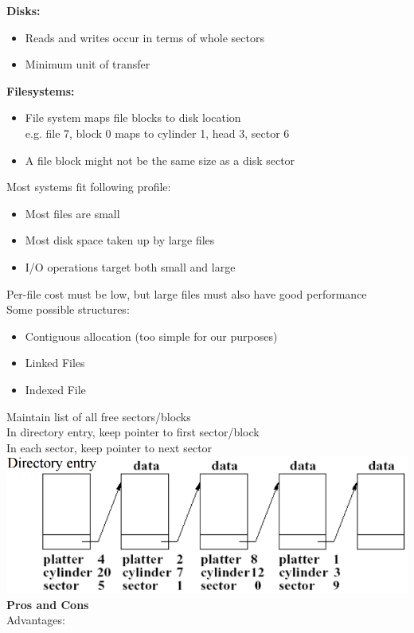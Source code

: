 \documentclass[number]{notes}
\begin{document}
\begin{landscape}
\begin{multicols}{3}
\textbf{Disks:}
\begin{itemize}[nolistsep]
    \item Reads and writes occur in terms of whole sectors
    \item Minimum unit of transfer
\end{itemize}
\textbf{Filesystems:}
\begin{itemize}[nolistsep]
    \item File system maps file blocks to disk location\\
    e.g. file 7, block 0 maps to cylinder 1, head 3, sector 6
    \item A file block might not be the same size as a disk sector
\end{itemize}
Most systems fit following profile:
\begin{itemize}[nolistsep]
    \item Most files are small
    \item Most disk space taken up by large files
    \item I/O operations target both small and large
\end{itemize}
Per-file cost must be low, but large files must also have good performance\\
Some possible structures:
\begin{itemize}[nolistsep]
    \item Contiguous allocation (too simple for our purposes)
    \item Linked Files
    \item Indexed File
\end{itemize}
Maintain list of all free sectors/blocks\\
In directory entry, keep pointer to first sector/block\\
In each sector, keep pointer to next sector
\includegraphics[width=\linewidth]{LinkedFile.png}
\textbf{Pros and Cons}\\
Advantages:
\begin{itemize}[nolistsep]

\end{itemize}
\end{multicols}
\end{landscape}
\end{document}
